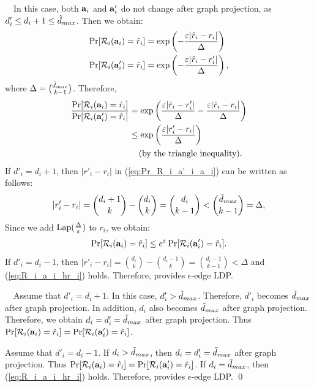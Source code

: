 {\smallskip
{}~~In this case, both $\mathbf{a}_i$ and $\mathbf{a}'_i$ do not change after graph projection, as $d'_i \leq d_i + 1 \leq \tilde{d}_{max}$. 
Then we obtain:
\begin{align*}
\Pr[\mathcal{R}_i(\mathbf{a}_i) = \hat{r}_i] &= \exp\left(-\frac{\varepsilon |\hat{r}_i- r_i|}{\Delta}\right) \\
\Pr[\mathcal{R}_i(\mathbf{a}'_i) = \hat{r}_i] &= \exp\left(-\frac{\varepsilon |\hat{r}_i- r'_i|}{\Delta}\right),
\end{align*}
where $\Delta = \binom{\tilde{d}_{max}}{k-1}$. 
Therefore, 
\begin{align}
\frac{\Pr[\mathcal{R}_i(\mathbf{a}_i) = \hat{r}_i]}{\Pr[\mathcal{R}_i(\mathbf{a}'_i) = \hat{r}_i]} 
&= \exp\left( \frac{\varepsilon |\hat{r}_i- r'_i|}{\Delta} - \frac{\varepsilon |\hat{r}_i- r_i|}{\Delta}\right) \nonumber\\
&\leq  \exp\left( \frac{\varepsilon |r'_i- r_i|}{\Delta} \right) \label{eq:Pr_R_i_a'_i_a_i}\\
& \hspace{4mm} (\text{by the triangle inequality}). \nonumber
\end{align}
If $d'_i = d_i + 1$, then $|r'_i- r_i|$ in (\ref{eq:Pr_R_i_a'_i_a_i}) can be written as follows:
\begin{align*}
|r'_i- r_i| 
= \binom{d_i+1}{k} - \binom{d_i}{k} 
= \binom{d_i}{k-1}
< \binom{\tilde{d}_{max}}{k-1}
= \Delta, 
\end{align*}
Since we add $\textrm{Lap}(\frac{\Delta}{\varepsilon})$ to $r_i$, we obtain:
\begin{align}
\Pr[\mathcal{R}_i(\mathbf{a}_i) = \hat{r}_i] \leq e^\varepsilon \Pr[\mathcal{R}_i(\mathbf{a}'_i) = \hat{r}_i]. 
\label{eq:R_i_a_i_hr_i}
\end{align}
If $d'_i = d_i - 1$, then $|r'_i- r_i| = \binom{d_i}{k} - \binom{d_i-1}{k} = \binom{d_i-1}{k-1} < \Delta$ and (\ref{eq:R_i_a_i_hr_i}) holds. 
Therefore,  provides $\epsilon$-edge LDP. 

\smallskip
{}~~Assume 
that $d'_i = d_i + 1$. 
In this case, $d'_i > \tilde{d}_{max}$. 
Therefore, $d'_i$ becomes $\tilde{d}_{max}$ after graph projection. 
In addition, 
$d_i$ also becomes $\tilde{d}_{max}$ after graph projection. 
Therefore, we obtain 
$d_i = d'_i = \tilde{d}_{max}$ after graph projection. 
Thus 
$\Pr[\mathcal{R}_i(\mathbf{a}_i) = \hat{r}_i] = \Pr[\mathcal{R}_i(\mathbf{a}'_i) = \hat{r}_i]$. 

Assume that $d'_i = d_i - 1$. 
If $d_i > \tilde{d}_{max}$, then $d_i = d'_i = \tilde{d}_{max}$ after graph projection. 
Thus $\Pr[\mathcal{R}_i(\mathbf{a}_i) = \hat{r}_i] = \Pr[\mathcal{R}_i(\mathbf{a}'_i) = \hat{r}_i]$. 
If $d_i = \tilde{d}_{max}$, then (\ref{eq:R_i_a_i_hr_i}) holds. 
Therefore,  provides $\epsilon$-edge LDP. \qed

}
